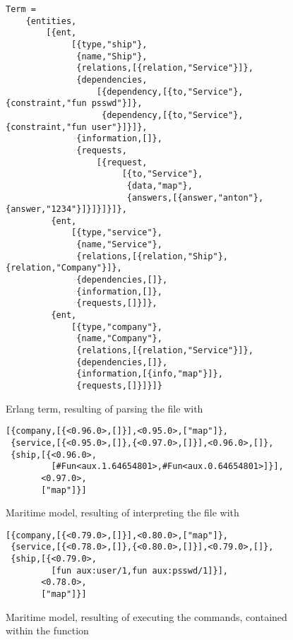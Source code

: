 \begin{figure}
	\centering
	\begin{lstlisting}[keywordstyle={}]
Term =
    {entities,
        [{ent,
             [{type,"ship"},
              {name,"Ship"},
              {relations,[{relation,"Service"}]},
              {dependencies,
                  [{dependency,[{to,"Service"},{constraint,"fun psswd"}]},
                   {dependency,[{to,"Service"},{constraint,"fun user"}]}]},
              {information,[]},
              {requests,
                  [{request,
                       [{to,"Service"},
                        {data,"map"},
                        {answers,[{answer,"anton"},{answer,"1234"}]}]}]}]},
         {ent,
             [{type,"service"},
              {name,"Service"},
              {relations,[{relation,"Ship"},{relation,"Company"}]},
              {dependencies,[]},
              {information,[]},
              {requests,[]}]},
         {ent,
             [{type,"company"},
              {name,"Company"},
              {relations,[{relation,"Service"}]},
              {dependencies,[]},
              {information,[{info,"map"}]},
              {requests,[]}]}]}
	\end{lstlisting}
	\caption{Erlang term, resulting of parsing the file  with }
	\label{fig:protocolParsed}
\end{figure}


\begin{figure}
	\centering
	\begin{lstlisting}[keywordstyle={}]
[{company,[{<0.96.0>,[]}],<0.95.0>,["map"]},
 {service,[{<0.95.0>,[]},{<0.97.0>,[]}],<0.96.0>,[]},
 {ship,[{<0.96.0>,
         [#Fun<aux.1.64654801>,#Fun<aux.0.64654801>]}],
       <0.97.0>,
       ["map"]}]
	\end{lstlisting}
	\caption{Maritime model, resulting of interpreting the file  with }
	\label{fig:protocolParsedInterpreted}
\end{figure}

\begin{figure}
  \centering
  \begin{lstlisting}[keywordstyle={}]
[{company,[{<0.79.0>,[]}],<0.80.0>,["map"]},
 {service,[{<0.78.0>,[]},{<0.80.0>,[]}],<0.79.0>,[]},
 {ship,[{<0.79.0>,
         [fun aux:user/1,fun aux:psswd/1]}],
       <0.78.0>,
       ["map"]}]
  \end{lstlisting}
  \caption{Maritime model, resulting of executing the commands, contained within the function }
  \label{fig:protocolManual}
\end{figure}
